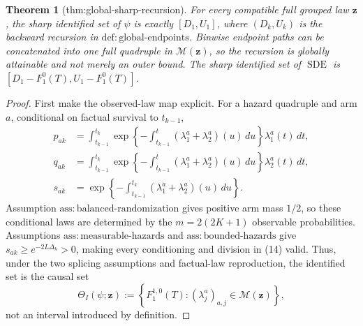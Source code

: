 \documentclass{article}
\newtheorem{theorem}{Theorem}
\begin{document}
\begin{theorem}[thm:global-sharp-recursion]\label{thm:global-sharp-recursion}
For every compatible full grouped law \(\mathbf z\), the sharp identified set of \(\psi\) is exactly \([D_1,U_1]\), where \((D_k,U_k)\) is the backward recursion in \(\mathrm{def{:}global\text{-}endpoints}\). Binwise endpoint paths can be concatenated into one full quadruple in \(\mathcal M(\mathbf z)\), so the recursion is globally attainable and not merely an outer bound. The sharp identified set of \(\operatorname{SDE}\) is \([D_1-F_1^0(T),U_1-F_1^0(T)]\).
\end{theorem}
\begin{proof}
First make the observed-law map explicit.  For a hazard quadruple and arm \(a\), conditional on factual survival to \(t_{k-1}\),
\[
\begin{aligned}
 p_{ak}&=\int_{t_{k-1}}^{t_k}
 \exp\!\left\{-\int_{t_{k-1}}^t(\lambda_1^a+\lambda_2^a)(u)\,du\right\}
 \lambda_1^a(t)\,dt,\\
 q_{ak}&=\int_{t_{k-1}}^{t_k}
 \exp\!\left\{-\int_{t_{k-1}}^t(\lambda_1^a+\lambda_2^a)(u)\,du\right\}
 \lambda_2^a(t)\,dt,\\
 s_{ak}&=\exp\!\left\{-\int_{t_{k-1}}^{t_k}(\lambda_1^a+\lambda_2^a)(u)\,du\right\}.
\end{aligned}                                                     \tag{14}
\]
Assumption \(\mathrm{ass{:}balanced\text{-}randomization}\) gives positive arm mass \(1/2\), so these conditional laws are determined by the \(m=2(2K+1)\) observable probabilities.  Assumptions \(\mathrm{ass{:}measurable\text{-}hazards}\) and \(\mathrm{ass{:}bounded\text{-}hazards}\) give \(s_{ak}\ge e^{-2L\Delta_k}>0\), making every conditioning and division in (14) valid.  Thus, under the two splicing assumptions and factual-law reproduction, the identified set is the causal set
\[
 \Theta_I(\psi;\mathbf z)
 :=\left\{F_1^{1,0}(T):(\lambda_j^a)_{a,j}\in\mathcal M(\mathbf z)\right\},  \tag{15}
\]
not an interval introduced by definition.


\end{proof}
\end{document}
